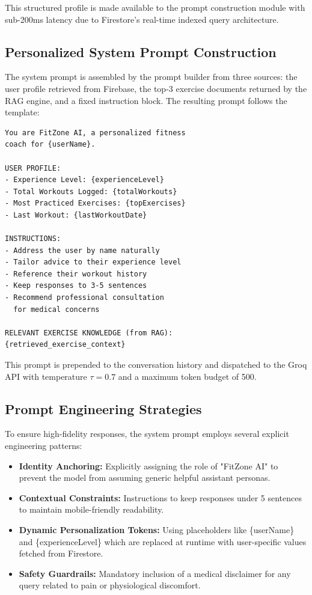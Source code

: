 \documentclass[conference]{IEEEtran}
\begin{document}
This structured profile is made available to the prompt construction module with sub-200ms latency due to Firestore's real-time indexed query architecture.

\subsection{Personalized System Prompt Construction}

The system prompt is assembled by the prompt builder from three sources: the user profile retrieved from Firebase, the top-3 exercise documents returned by the RAG engine, and a fixed instruction block. The resulting prompt follows the template:

\begin{lstlisting}[language={},caption={Personalized System Prompt Template},label={lst:prompt}]
You are FitZone AI, a personalized fitness
coach for {userName}.

USER PROFILE:
- Experience Level: {experienceLevel}
- Total Workouts Logged: {totalWorkouts}
- Most Practiced Exercises: {topExercises}
- Last Workout: {lastWorkoutDate}

INSTRUCTIONS:
- Address the user by name naturally
- Tailor advice to their experience level
- Reference their workout history
- Keep responses to 3-5 sentences
- Recommend professional consultation
  for medical concerns

RELEVANT EXERCISE KNOWLEDGE (from RAG):
{retrieved_exercise_context}
\end{lstlisting}

This prompt is prepended to the conversation history and dispatched to the Groq API with temperature $\tau = 0.7$ and a maximum token budget of 500.

\subsection{Prompt Engineering Strategies}

To ensure high-fidelity responses, the system prompt employs several explicit engineering patterns:
\begin{itemize}
    \item \textbf{Identity Anchoring:} Explicitly assigning the role of "FitZone AI" to prevent the model from assuming generic helpful assistant personas.
    \item \textbf{Contextual Constraints:} Instructions to keep responses under 5 sentences to maintain mobile-friendly readability.
    \item \textbf{Dynamic Personalization Tokens:} Using placeholders like \{userName\} and \{experienceLevel\} which are replaced at runtime with user-specific values fetched from Firestore.
    \item \textbf{Safety Guardrails:} Mandatory inclusion of a medical disclaimer for any query related to pain or physiological discomfort.
\end{itemize}
\end{document}
